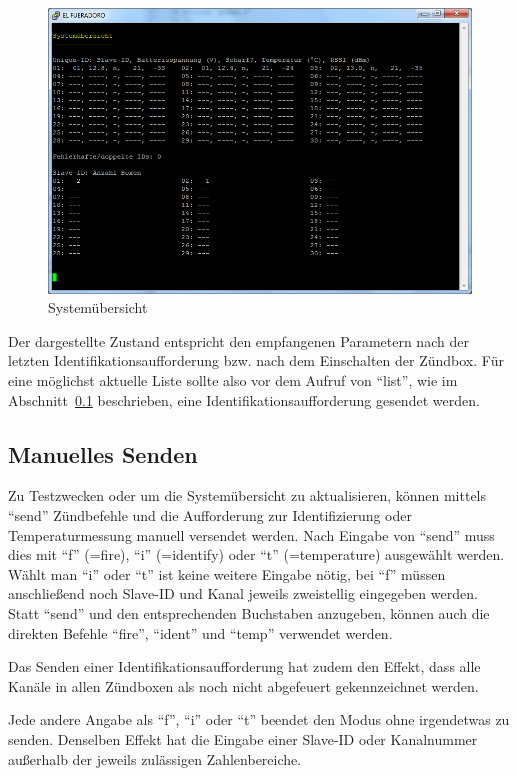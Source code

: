 \documentclass[pdftex, parskip, numbers=noenddot, toc=listof]{scrbook}
\begin{document}
	\begin{figure}[t]
		\centering
		\includegraphics[width=.8\textwidth]{Bilder/list}
		\caption{Systemübersicht}
		\label{fig:list}
	\end{figure}

	Der dargestellte Zustand entspricht den empfangenen Parametern nach der letzten Identifikationsaufforderung bzw. nach dem Einschalten der Zündbox. Für eine möglichst aktuelle Liste sollte also vor dem Aufruf von \enquote{list}, wie im Abschnitt~\ref{sec:manuellessenden} beschrieben, eine Identifikationsaufforderung gesendet werden.


	\subsection{Manuelles Senden}
	\label{sec:manuellessenden}

	Zu Testzwecken oder um die Systemübersicht zu aktualisieren, können mittels \enquote{send} Zündbefehle und die Aufforderung zur Identifizierung oder Temperaturmessung manuell versendet werden. Nach Eingabe von \enquote{send} muss dies mit \enquote{f} (=fire), \enquote{i} (=identify) oder \enquote{t} (=temperature) ausgewählt werden. Wählt man \enquote{i} oder \enquote{t} ist keine weitere Eingabe nötig, bei \enquote{f} müssen anschließend noch Slave-ID und Kanal jeweils zweistellig eingegeben werden. Statt \enquote{send} und den entsprechenden Buchstaben anzugeben, können auch die direkten Befehle \mbox{\enquote{fire}}, \mbox{\enquote{ident}} und \mbox{\enquote{temp}} verwendet werden.

	Das Senden einer Identifikationsaufforderung hat zudem den Effekt, dass alle Kanäle in allen Zündboxen als noch nicht abgefeuert gekennzeichnet werden.

	Jede andere Angabe als \enquote{f}, \enquote{i} oder \enquote{t} beendet den Modus ohne irgendetwas zu senden. Denselben Effekt hat die Eingabe einer Slave-ID oder Kanalnummer außerhalb der jeweils zulässigen Zahlenbereiche.
\end{document}
